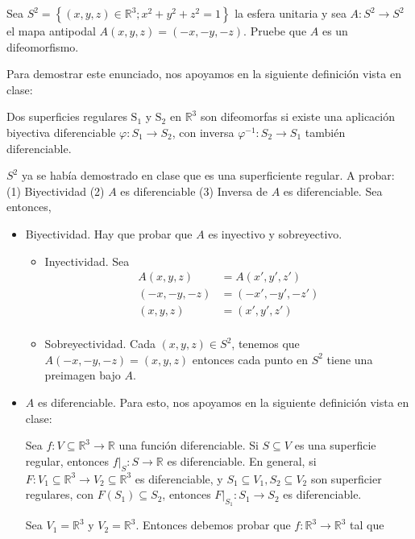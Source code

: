 \begin{problema}
    Sea $S^2=\left\{(x, y, z) \in \mathbb{R}^3 ; x^2+y^2+z^2=1\right\}$ la esfera unitaria y sea $A: S^2 \rightarrow S^2$ el mapa antipodal $A(x, y, z)=(-x,-y,-z)$. Pruebe que $A$ es un difeomorfismo.
    \begin{dem}
        Para demostrar este enunciado, nos apoyamos en la siguiente definición vista en clase:
        \begin{cajita}
Dos superficies regulares $\mathrm{S}_1$ y $\mathrm{S}_2$ en $\mathbb{R}^3$ son difeomorfas si existe una aplicación biyectiva diferenciable $\varphi: S_1 \rightarrow S_2$, con inversa $\varphi^{-1}: S_2 \rightarrow S_1$ también diferenciable.
        \end{cajita}
        $S^2$ ya se había demostrado en clase que es una superficiente regular. A probar: (1) Biyectividad (2) $A$ es diferenciable (3) Inversa de $A$ es diferenciable. 
        Sea entonces, 
        \begin{itemize}
            \item Biyectividad. Hay que probar que $A$ es inyectivo y sobreyectivo. \begin{itemize}
                \item Inyectividad. Sea
                \begin{align*}
                    A(x,y,z) &= A(x',y',z')\\
                    (-x, -y, -z) &= (-x', -y', -z')\\
                    (x, y, z) &= (x', y', z')\\
                \end{align*}
                \item Sobreyectividad. Cada $(x,y,z)\in S^2$, tenemos que $A(-x,-y,-z)= (x,y,z)$ entonces cada punto en $S^2$ tiene una preimagen bajo $A$. 
            \end{itemize}
            \item $A$ es diferenciable. Para esto, nos apoyamos en la siguiente definición vista en clase: 
            \begin{cajita}
                Sea $f: V \subseteq \mathbb{R}^3 \rightarrow \mathbb{R}$ una función diferenciable. Si $S \subseteq V$ es una superficie regular, entonces $\left.f\right|_S: S \rightarrow \mathbb{R}$ es diferenciable.\bigbreak 
En general, si $F: V_1 \subseteq \mathbb{R}^3 \rightarrow V_2 \subseteq \mathbb{R}^3$ es diferenciable, y $S_1 \subseteq V_1, S_2 \subseteq V_2$ son superficier regulares, con $F\left(S_1\right) \subseteq S_2$, entonces $\left.F\right|_{S_1}: S_1 \rightarrow S_2$ es diferenciable.
            \end{cajita}
            Sea $V_1=\mathbb{R}^3$ y $V_2=\mathbb{R}^3$. Entonces debemos probar que $f:\mathbb{R}^3\to \mathbb{R}^3$ tal que 


\end{itemize}
\end{dem}
\end{problema}
